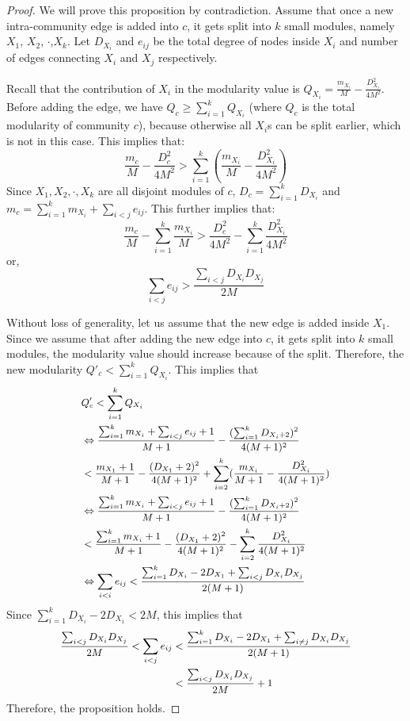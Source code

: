 \begin{proof}
We will prove this proposition by contradiction.
Assume that once a new intra-community edge is added into $c$, it gets split into $k$ small modules, namely $X_1$, $X_2$, $\cdot$,$X_k$. Let $D_{X_i}$ and $e_{ij}$ be the total degree of nodes inside $X_i$ and number of edges connecting $X_i$ and $X_j$ respectively. 


Recall that the contribution of $X_i$ in the modularity value is $Q_{X_i}=\frac{m_{X_i}}{M} - \frac{D_{X_i}^2}{4M^2}$.  Before adding the edge, we have $Q_c \geq \sum_{i=1}^k Q_{X_i}$ (where $Q_c$ is the total modularity of community $c$), because otherwise all $X_i$s can be split earlier, which is not in this case. This implies that:
\[
\frac{m_c}{M}- \frac{D_c^2}{4M^2} > \sum_{i=1}^k (\frac{m_{X_i}}{M} - \frac{D_{X_i}^2}{4M^2})
\]
Since $X_1,X_2,\cdot,X_k$ are all disjoint modules of $c$, $D_c=\sum_{i=1}^k D_{X_i}$ and $m_c=\sum_{i=1}^k m_{X_i} + \sum_{i<j} e_{ij}$. This further implies that:
\[
\frac{m_c}{M}-\sum_{i=1}^k \frac{m_{X_i}}{M} > \frac{D_c^2}{4M^2}- \sum_{i=1}^k \frac{D_{X_i}^2}{4M^2}
\]
or,
\[
\sum_{i<j} e_{ij} > \frac{\sum_{i<j} D_{X_i}D_{X_j}}{2M}
\]
 
 Without loss of generality, let us assume that the new edge is added inside $X_1$. 
Since we assume that after adding the new edge into $c$, it gets split into $k$ small modules, the modularity value should increase because of the split. Therefore, the new modularity $Q'_c<\sum_{i=1}^k Q_{X_i}$. This implies that
\[\small
\begin{split}\small
& Q'_c < \sum_{i=1}^k Q_{X_i}\\
& \Leftrightarrow \frac{\sum_{i=1}^k m_{X_i} + \sum_{i<j} e_{ij} + 1}{M+1} - \frac{(\sum_{i=1}^k D_{X_i +2})^2}{4(M+1)^2}\\
& <  \frac{m_{X_1}+1}{M+1} - \frac{(D_{X_1}+2)^2}{4(M+1)^2}  + \sum_{i=2}^k  (\frac{m_{X_i}}{M+1} - \frac{D_{X_i}^2}{4(M+1)^2} )\\
&\Leftrightarrow \frac{\sum_{i=1}^k m_{X_i} + \sum_{i<j} e_{ij} + 1}{M+1} - \frac{(\sum_{i=1}^k D_{X_i +2})^2}{4(M+1)^2}\\
& < \frac{\sum_{i=1}^k m_{X_i}+1}{M+1} - \frac{(D_{X_1}+2)^2}{4(M+1)^2} - \sum_{i=2}^k \frac{D_{X_i}^2}{4(M+1)^2}\\
&\Leftrightarrow \sum_{i<i} e_{ij} < \frac{\sum_{i=1}^k D_{X_i} - 2 D_{X_1} + \sum_{i<j} D_{X_i}D_{X_j}}{2(M+1)}
\end{split}
\]
Since $\sum_{i=1}^k D_{X_i} - 2D_{X_1} < 2M$, this implies that 
\[\small
\begin{split}
\frac{\sum_{i<j}D_{X_i}D_{X_j}}{2M}  < \sum_{i<j}e_{ij} 
&< \frac{\sum_{i=1}^k D_{X_i} - 2D_{X_1} + \sum_{i\neq j}{D_{X_i}D_{X_j}}}{2(M+1)}\\
& <\frac{\sum_{i<j}D_{X_i}D_{X_j}}{2M}+1
\end{split}
\]
Therefore, the proposition holds.
\end{proof}








